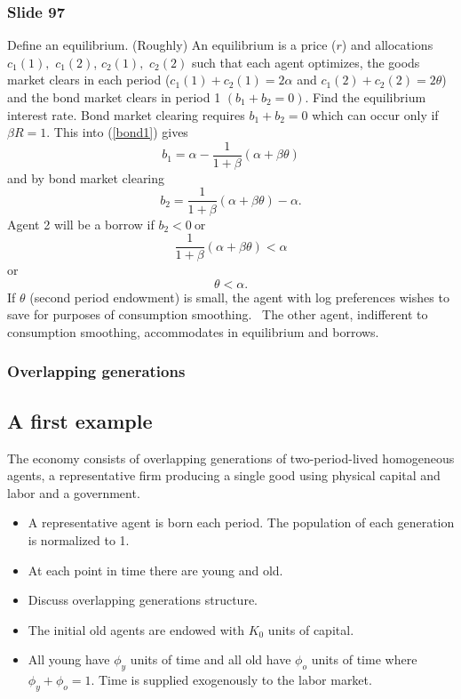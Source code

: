 \documentclass[aspectratio=169]{ltx-talk}
\begin{document}
\begin{frame}
\frametitle{Slide 97}
Define an equilibrium. (Roughly) An equilibrium is a price ($r$) and
allocations $c_{1}\left( 1\right) ,$ $c_{1}\left( 2\right) $, $c_{2}\left(
1\right) ,$ $c_{2}\left( 2\right) $ such that each agent optimizes, the
goods market clears in each period ($c_{1}\left( 1\right) +c_{2}\left(
1\right) =2\alpha $ and $c_{1}\left( 2\right) +c_{2}\left( 2\right) =2\theta 
$) and the bond market clears in period 1 $\left( b_{1}+b_{2}=0\right) .$
Find the equilibrium interest rate. Bond market clearing requires $%
b_{1}+b_{2}=0$ which can occur only if $\beta R=1.$ This into (\ref{bond1})
gives%
\begin{equation*}
b_{1}=\alpha -\frac{1}{1+\beta }\left( \alpha +\beta \theta \right)
\end{equation*}%
and by bond market clearing 
\begin{equation*}
b_{2}=\frac{1}{1+\beta }\left( \alpha +\beta \theta \right) -\alpha .
\end{equation*}%
Agent 2 will be a borrow if $b_{2}<0\ $or 
\begin{equation*}
\frac{1}{1+\beta }\left( \alpha +\beta \theta \right) <\alpha
\end{equation*}%
or%
\begin{equation*}
\theta <\alpha .
\end{equation*}%
If $\theta $ (second period endowment) is small, the agent with log
preferences wishes to save for purposes of consumption smoothing. \ The
other agent, indifferent to consumption smoothing, accommodates in
equilibrium and borrows.
\end{frame}

\begin{frame}
\frametitle{Overlapping generations}
\subsection{A first example}

The economy consists of overlapping generations of two-period-lived
homogeneous agents, a representative firm producing a single good using
physical capital and labor and a government.

\begin{itemize}
\item A representative agent is born each period. The population of each
generation is normalized to 1.

\item At each point in time there are young and old.

\item Discuss overlapping generations structure.

\item The initial old agents are endowed with $K_{0}$ units of capital$.$

\item All young have $\phi _{y}$ units of time and all old have $\phi _{o}$
units of time where $\phi _{y}+\phi _{o}=1.$ Time is supplied exogenously to
the labor market.
\end{itemize}
\end{frame}
\end{document}
